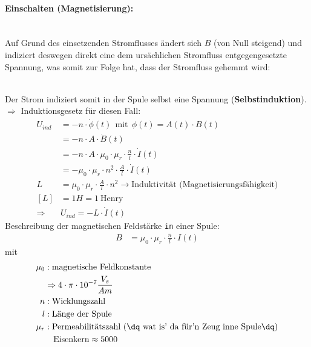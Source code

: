 \documentclass[12pt,a4paper]{report}
\begin{document}
	\thispagestyle{empty}
	\paragraph{Einschalten (Magnetisierung):} \mbox{} \\
	Auf Grund des einsetzenden Stromflusses ändert sich $B$ (von Null steigend) und indiziert deswegen direkt eine dem ursächlichen Stromfluss entgegengesetzte Spannung, was somit zur Folge hat, dass der Stromfluss gehemmt wird: \\[1cm]
\vspace{2cm}
	\vspace{0cm}\\
	\noindent
	Der Strom indiziert somit in der Spule selbst eine Spannung (\textbf{Selbstinduktion}). \\
	$\Rightarrow$ Induktionsgesetz für diesen Fall: \\
	\begin{align*}
		U_{ind} &= -n \cdot \dot \phi(t)\ \ \text{mit}\ \ \phi(t) = A(t) \cdot B(t) \\
		&= -n \cdot A \cdot \dot B(t) \\
		&= -n \cdot A \cdot \mu_0 \cdot \mu_r \cdot \frac{n}{l} \cdot \dot I(t) \\
		&= -\mu_0 \cdot \mu_r \cdot n^2 \cdot \frac{A}{l} \cdot \dot I(t) \\
		L&= \mu_0 \cdot \mu_r \cdot \frac{A}{l} \cdot n^2 \to \text{Induktivität (Magnetisierungsfähigkeit)} \\
		[L] &= 1H = 1\  \text{Henry} \\
		\Rightarrow& U_{ind} = -L \cdot \dot I(t)
	\end{align*}
	Beschreibung der magnetischen Feldstärke \texttt{in} einer Spule:
	\begin{align*}
		B &= \mu_0 \cdot \mu_r \cdot \frac{n}{l} \cdot I(t)
	\end{align*}
	mit\\
	\begin{align*}
		\mu_0&: \text{magnetische Feldkonstante} \\
		&\Rightarrow 4 \cdot \pi \cdot 10^{-7} \frac{V_s}{Am} \\
		n&: \text{Wicklungszahl} \\
		l&: \text{Länge der Spule} \\
		\mu_r&: \text{Permeabilitätszahl (\dq wat is' da für'n Zeug inne Spule\dq)} \\
		&\ \ \ \text{Eisenkern} \approx 5000
	\end{align*}
\end{document}
